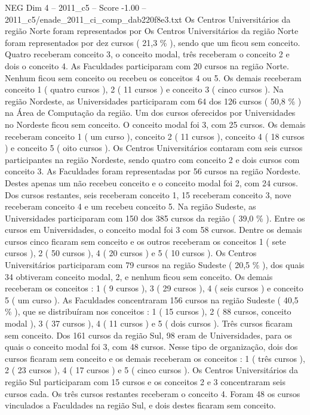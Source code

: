\begin{textsample}{NEG Dim 4 – 2011\_c5 – Score -1.00 – 2011\_c5/enade\_2011\_ci\_comp\_dab220f8e3.txt}
Os Centros Universitários da região Norte foram representados por Os Centros Universitários da região Norte foram representados por dez cursos ( 21,3 \% ), sendo que um ficou sem conceito.
Quatro receberam conceito 3, o conceito modal, três receberam o conceito 2 e dois o conceito 4.
As Faculdades participaram com 20 cursos na região Norte.
Nenhum ficou sem conceito ou recebeu os conceitos 4 ou 5.
Os demais receberam conceito 1 ( quatro cursos ), 2 ( 11 cursos ) e conceito 3 ( cinco cursos ).
Na região Nordeste, as Universidades participaram com 64 dos 126 cursos ( 50,8 \% ) na Área de Computação da região.
Um dos cursos oferecidos por Universidades no Nordeste ficou sem conceito.
O conceito modal foi 3, com 25 cursos.
Os demais receberam conceito 1 ( um curso ), conceito 2 ( 11 cursos ), conceito 4 ( 18 cursos ) e conceito 5 ( oito cursos ).
Os Centros Universitários contaram com seis cursos participantes na região Nordeste, sendo quatro com conceito 2 e dois cursos com conceito 3.
As Faculdades foram representadas por 56 cursos na região Nordeste.
Destes apenas um não recebeu conceito e o conceito modal foi 2, com 24 cursos.
Dos cursos restantes, seis receberam conceito 1, 15 receberam conceito 3, nove receberam conceito 4 e um recebeu conceito 5.
Na região Sudeste, as Universidades participaram com 150 dos 385 cursos da região ( 39,0 \% ).
Entre os cursos em Universidades, o conceito modal foi 3 com 58 cursos.
Dentre os demais cursos cinco ficaram sem conceito e os outros receberam os conceitos 1 ( sete cursos ), 2 ( 50 cursos ), 4 ( 20 cursos ) e 5 ( 10 cursos ).
Os Centros Universitários participaram com 79 cursos na região Sudeste ( 20,5 \% ), dos quais 34 obtiveram conceito modal, 2, e nenhum ficou sem conceito.
Os demais receberam os conceitos : 1 ( 9 cursos ), 3 ( 29 cursos ), 4 ( seis cursos ) e conceito 5 ( um curso ).
As Faculdades concentraram 156 cursos na região Sudeste ( 40,5 \% ), que se distribuíram nos conceitos : 1 ( 15 cursos ), 2 ( 88 cursos, conceito modal ), 3 ( 37 cursos ), 4 ( 11 cursos ) e 5 ( dois cursos ).
Três cursos ficaram sem conceito.
Dos 161 cursos da região Sul, 98 eram de Universidades, para os quais o conceito modal foi 3, com 48 cursos.
Nesse tipo de organização, dois dos cursos ficaram sem conceito e os demais receberam os conceitos : 1 ( três cursos ), 2 ( 23 cursos ), 4 ( 17 cursos ) e 5 ( cinco cursos ).
Os Centros Universitários da região Sul participaram com 15 cursos e os conceitos 2 e 3 concentraram seis cursos cada.
Os três cursos restantes receberam o conceito 4.
Foram 48 os cursos vinculados a Faculdades na região Sul, e dois destes ficaram sem conceito.

\end{textsample}
